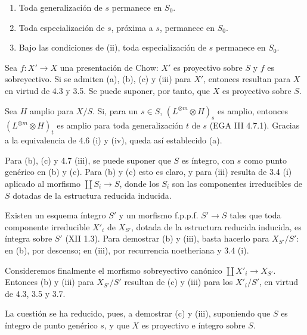 
\providecommand{\sisi}[2]{#2}

\begin{enumerate}[label=(\alph*)]
\item Toda generalización de $s$ permanece en $S_0$.
\item Toda especialización de $s$, próxima a $s$, permanece en $S_0$.
\item Bajo las condiciones de (ii), toda especialización de $s$ permanece
en $S_0$.
\end{enumerate}

Sea $f:X'\to X$ una presentación de Chow: $X'$ es proyectivo sobre $S$ y
$f$ es sobreyectivo. Si se admiten (a), (b), (c) y (iii) para $X'$, entonces
resultan para $X$ en virtud de 4.3 y 3.5. Se puede suponer, por tanto, que
$X$ es proyectivo sobre $S$.

Sea $H$ amplio para $X/S$. Si, para un $s\in S$,
$(L^{\otimes m}\otimes H)_s$ es amplio, entonces
$(L^{\otimes m}\otimes H)_t$ es amplio para toda generalización $t$ de $s$
(EGA III 4.7.1). Gracias a la equivalencia de 4.6 (i) y (iv), queda así
establecido (a).

Para (b), (c) y 4.7 (iii), se puede suponer que $S$ es íntegro, con $s$
como punto genérico en (b) y (c). Para (b) y (c) esto es claro, y para (iii)
resulta de 3.4 (i) aplicado al morfismo $\coprod S_i\to S$, donde los $S_i$
son las componentes irreducibles de $S$ dotadas de la estructura reducida
inducida.

Existen un esquema íntegro $S'$ y un morfismo f.p.p.f. $S'\to S$ tales que
toda componente irreducible $X'_i$ de $X_{S'}$, dotada de la estructura
reducida inducida, es íntegra sobre $S'$ (XII 1.3). Para demostrar (b) y
(iii), basta hacerlo para $X_{S'}/S'$: en (b), por descenso; en (iii), por
recurrencia noetheriana y 3.4 (i).

Consideremos finalmente el morfismo sobreyectivo canónico
$\coprod X'_i\to X_{S'}$. Entonces (b) y (iii) para $X_{S'}/S'$ resultan de
(c) y (iii) para los $X'_i/S'$, en virtud de 4.3, 3.5 y 3.7.

La cuestión se ha reducido, pues, a demostrar (c) y (iii), suponiendo que
$S$ es íntegro de punto genérico $s$, y que $X$ es proyectivo e íntegro
sobre $S$.

